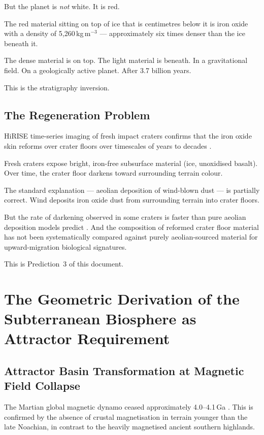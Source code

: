 \documentclass[11pt, a4paper]{article}
\begin{document}
But the planet is \emph{not} white. It is red.

The red material sitting on top of ice that is
centimetres below it is iron oxide with a density
of 5,260\,kg\,m$^{-3}$ --- approximately six
times denser than the ice beneath it.

The dense material is on top.
The light material is beneath.
In a gravitational field.
On a geologically active planet.
After 3.7 billion years.

This is the stratigraphy inversion.

\subsection{The Regeneration Problem}

HiRISE time-series imaging of fresh impact
craters confirms that the iron oxide skin
reforms over crater floors over timescales
of years to decades \cite{hirise2021}.

Fresh craters expose bright, iron-free
subsurface material (ice, unoxidised basalt).
Over time, the crater floor darkens toward
surrounding terrain colour.

The standard explanation --- aeolian deposition
of wind-blown dust --- is partially correct.
Wind deposits iron oxide dust from surrounding
terrain into crater floors.

But the rate of darkening observed in some
craters is faster than pure aeolian deposition
models predict \cite{crater_darkening}.
And the composition of reformed crater floor
material has not been systematically compared
against purely aeolian-sourced material for
upward-migration biological signatures.

This is Prediction~3 of this document.

\section{The Geometric Derivation of the
Subterranean Biosphere as Attractor Requirement}

\subsection{Attractor Basin Transformation
at Magnetic Field Collapse}

The Martian global magnetic dynamo ceased
approximately 4.0--4.1\,Ga \cite{marsfield}.
This is confirmed by the absence of crustal
magnetisation in terrain younger than the
late Noachian, in contrast to the heavily
magnetised ancient southern highlands.
\end{document}
